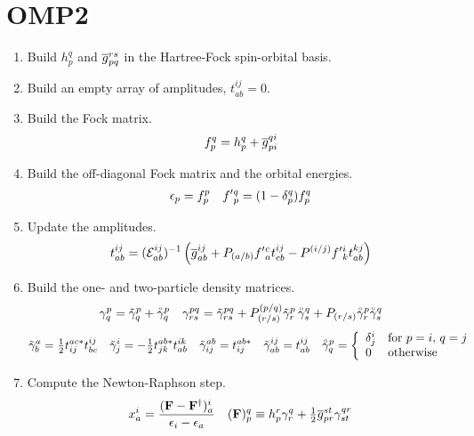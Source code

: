 \documentclass[11pt]{article}
\newcommand{\oc}[1]{\ensuremath{\accentset{\circ}{#1}}}
\begin{document}
\section*{OMP2}


\begin{enumerate}
\item
Build $h_p^q$ and $\overline{g}_{pq}^{rs}$ in the Hartree-Fock spin-orbital basis.

\item
Build an empty array of amplitudes, $t_{ab}^{ij}=0$.

\item
\label{item:recursive-step}
Build the Fock matrix.
\begin{align}
  f_p^q
=
  h_p^q
+
  \overline{g}_{pi}^{qi}
\end{align}

\item
Build the off-diagonal Fock matrix and the orbital energies.
\begin{align}
  \epsilon _p
=
  f_p^p
&&
  f'{}_p^q
=
  (1 - \delta _p^q)
  f_p^q
\end{align}

\item
\label{itemocc-step-one}
Update the amplitudes.
\begin{align}
  t_{ab}^{ij}
=
  (\mathcal{E}_{ab}^{ij})^{-1}
  \left(
    \overline{g}_{ab}^{ij}
  +
    P_{(a/b)}
    f'{}_a^c
    t_{cb}^{ij}
  -
    P^{(i/j)}
    f'{}_k^i
    t_{ab}^{kj}
  \right)
\end{align}

\item
Build the one- and two-particle density matrices.
\begin{align}
  \g^p_q
=
  \tl{\g}^p_q
+
  \oc{\g}^p_q
&&
  \g^{pq}_{rs}
=
  \tl{\g}^{pq}_{rs}
+
  P^{(p/q)}_{(r/s)}
  \tl{\g}^p_r\,
  \oc{\g}^q_s
+
  P_{(r/s)}
  \oc{\g}^p_r
  \oc{\g}^q_s
\end{align}
\begin{align}
  \tl{\g}^a_b
=
  \tfr{1}{2}
  t^{ac*}_{ij}
  t_{bc}^{ij}
&&
  \tl{\g}^i_j
=
-
  \tfr{1}{2}
  t^{ab*}_{jk}
  t_{ab}^{ik}
&&
  \tl{\g}_{ij}^{ab}
=
  t_{ij}^{ab*}
&&
  \tl{\g}_{ab}^{ij}
=
  t_{ab}^{ij}
&&
  \oc{\g}^p_q
=
\left\{
\begin{array}{ll}
  \d^i_j
&
  \text{for $p=i$, $q=j$}
\\
  0
&
  \text{otherwise}
\end{array}
\right.
\end{align}

\item
Compute the Newton-Raphson step.
\begin{align}
  x_a^i
=
  \frac {(\mathbf{F} - \mathbf{F}^\dagger)_a^i}{\epsilon _i - \epsilon _a}
&&
  (\mathbf{F})_p^q
\equiv
  h_p^r
  \gamma ^q_r
+
  \tfrac{1}{2}
  \overline{g}_{pr}^{st}
  \gamma ^{qr}_{st}
\end{align}


\end{enumerate}
\end{document}

